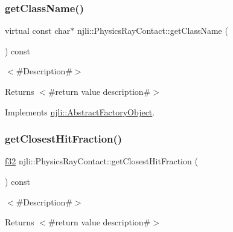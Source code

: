 \subsubsection{\texorpdfstring{get\+Class\+Name()}{getClassName()}}
{\footnotesize\ttfamily virtual const char$\ast$ njli\+::\+Physics\+Ray\+Contact\+::get\+Class\+Name (\begin{DoxyParamCaption}{ }\end{DoxyParamCaption}) const\hspace{0.3cm}{\ttfamily [virtual]}}

$<$\#\+Description\#$>$

\begin{DoxyReturn}{Returns}
$<$\#return value description\#$>$ 
\end{DoxyReturn}


Implements \mbox{\hyperlink{classnjli_1_1_abstract_factory_object_af4151e41b80d5bc3fc42822c67fc2278}{njli\+::\+Abstract\+Factory\+Object}}.

\mbox{\label{classnjli_1_1_physics_ray_contact_a911887e0780b9a95c0d003833034f58f}} 
\subsubsection{\texorpdfstring{get\+Closest\+Hit\+Fraction()}{getClosestHitFraction()}}
{\footnotesize\ttfamily \mbox{\hyperlink{_util_8h_a5f6906312a689f27d70e9d086649d3fd}{f32}} njli\+::\+Physics\+Ray\+Contact\+::get\+Closest\+Hit\+Fraction (\begin{DoxyParamCaption}{ }\end{DoxyParamCaption}) const}

$<$\#\+Description\#$>$

\begin{DoxyReturn}{Returns}
$<$\#return value description\#$>$ 
\end{DoxyReturn}
\mbox{\label{classnjli_1_1_physics_ray_contact_aa7508ae743098d57b2e11862decfeb2f}} 
